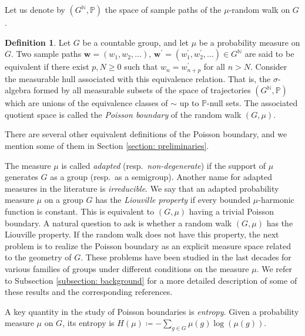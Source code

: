 \documentclass[reqno,oneside,11pt]{amsart}
\renewcommand{\P}{\mathbb{P}}
\theoremstyle{plain}
\theoremstyle{definition}
\newtheorem{defn}[thm]{Definition} %
\begin{document}
Let us denote by $(G^{\mathbb{N}},\P)$ the space of sample paths of the $\mu$-random walk on $G$.

\begin{defn}\label{defn: Poisson boundary original def} Let $G$ be a countable group, and let $\mu$ be a probability measure on $G$. Two sample paths $\mathbf{w}=(w_1,w_2,\ldots)$, $\mathbf{w^\prime}=(w^\prime_1,w^\prime_2,\ldots)\in G^{\mathbb{N}}$ are said to be equivalent if there exist $p,N\ge 0$ such that $w_n=w^\prime_{n+p}$ for all $n>N$. Consider the measurable hull associated with this equivalence relation. That is, the $\sigma$-algebra formed by all measurable subsets of the space of trajectories $(G^{\mathbb{N}},\P)$ which are unions of the equivalence classes of $\sim$ up to $\P$-null sets. The associated quotient space is called the \emph{Poisson boundary} of the random walk $(G,\mu)$.
\end{defn}

There are several other equivalent definitions of the Poisson boundary, and we mention some of them in Section \ref{section: preliminaries}.

The measure $\mu$ is called \emph{adapted} (resp.\ \emph{non-degenerate}) if the support of $\mu$ generates $G$ as a group (resp.\ as a semigroup). Another name for adapted measures in the literature is \emph{irreducible}. We say that an adapted probability measure $\mu$ on a group $G$ has the \emph{Liouville property} if every bounded $\mu$-harmonic function is constant. This is equivalent to $(G,\mu)$ having a trivial Poisson boundary. A natural question to ask is whether a random walk $(G,\mu)$ has the Liouville property. If the random walk does not have this property, the next problem is to realize the Poisson boundary as an explicit measure space related to the geometry of $G$. These problems have been studied in the last decades for various families of groups under different conditions on the measure $\mu$. We refer to Subsection \ref{subsection: background} for a more detailed description of some of these results and the corresponding references.

A key quantity in the study of Poisson boundaries is \emph{entropy}. Given a probability measure $\mu$ on $G$, its entropy is $H(\mu)\coloneqq -\sum_{g\in G}\mu(g)\log(\mu(g))$. 
\end{document}

